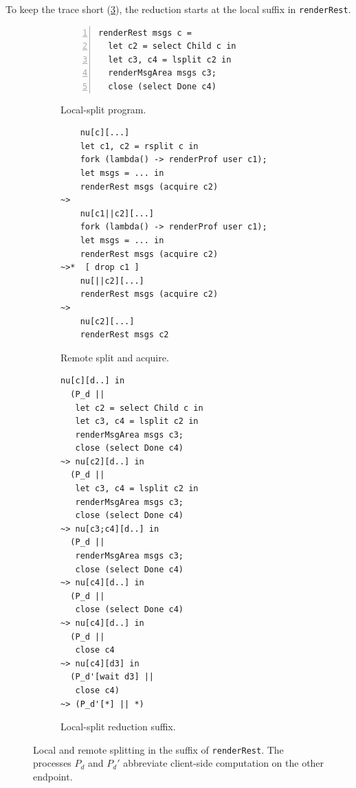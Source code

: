 To keep the trace short (\cref{fig:local-split-trace}), the
reduction starts at the local suffix in \lstinline{renderRest}.
\begin{figure}
\begin{minipage}[t]{0.49\linewidth}
\begin{subfigure}[t]{\linewidth}
\begin{lstlisting}[numbers=left]
renderRest msgs c =
  let c2 = select Child c in
  let c3, c4 = lsplit c2 in
  renderMsgArea msgs c3;
  close (select Done c4)
\end{lstlisting}
\caption{Local-split program.}
\label{fig:local-split-program}
\end{subfigure}

\medskip

\setcounter{subfigure}{2}
\begin{subfigure}[t]{\linewidth}
\begin{lstlisting}
    nu[c][...]
    let c1, c2 = rsplit c in
    fork (lambda() -> renderProf user c1);
    let msgs = ... in
    renderRest msgs (acquire c2)
~>
    nu[c1||c2][...]
    fork (lambda() -> renderProf user c1);
    let msgs = ... in
    renderRest msgs (acquire c2)
~>*  [ drop c1 ]
    nu[||c2][...]
    renderRest msgs (acquire c2)
~>
    nu[c2][...]
    renderRest msgs c2
\end{lstlisting}
\caption{Remote split and acquire.}
\label{fig:remote-split-trace}
\end{subfigure}
\end{minipage}\hfill
\setcounter{subfigure}{1}
\begin{subfigure}[t]{0.49\linewidth}
\begin{lstlisting}
nu[c][d..] in
  (P_d ||
   let c2 = select Child c in
   let c3, c4 = lsplit c2 in
   renderMsgArea msgs c3;
   close (select Done c4)
~> nu[c2][d..] in
  (P_d ||
   let c3, c4 = lsplit c2 in
   renderMsgArea msgs c3;
   close (select Done c4)
~> nu[c3;c4][d..] in
  (P_d ||
   renderMsgArea msgs c3;
   close (select Done c4)
~> nu[c4][d..] in
  (P_d ||
   close (select Done c4)
~> nu[c4][d..] in
  (P_d ||
   close c4
~> nu[c4][d3] in
  (P_d'[wait d3] ||
   close c4)
~> (P_d'[*] || *)
\end{lstlisting}
\caption{Local-split reduction suffix.}
\label{fig:local-split-trace}
\end{subfigure}
\setcounter{subfigure}{3}
\caption{Local and remote splitting in the suffix of \lstinline{renderRest}.
The processes $P_d$ and $P_d'$ abbreviate client-side
computation on the other endpoint.}
\label{fig:local-split-reduction}
\end{figure}
